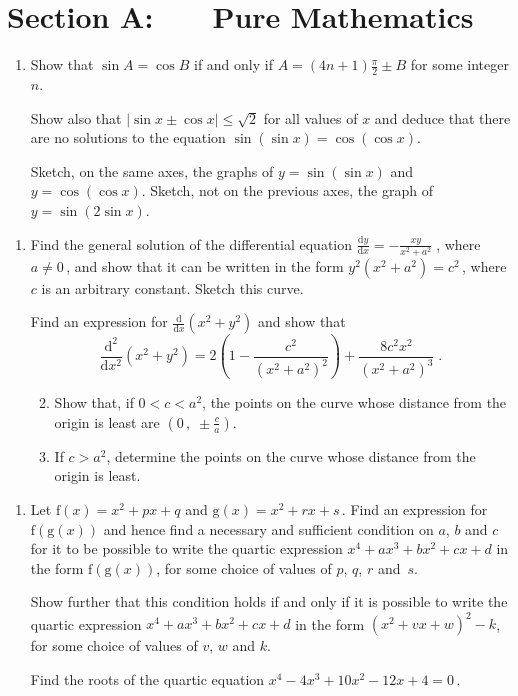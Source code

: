 \documentclass[a4, 11pt]{report}
\newlength{\qspace}
\newcounter{qnumber}
\newenvironment{question}%
 {\vspace{\qspace}
  \begin{enumerate}[\bfseries 1\quad][10]%
    \setcounter{enumi}{\value{qnumber}}%
    \item%
 }
{
  \end{enumerate}
  \filbreak
  \stepcounter{qnumber}
 }
\newenvironment{questionparts}[1][1]%
 {
  \begin{enumerate}[\bfseries (i)]%
    \setcounter{enumii}{#1}
    \addtocounter{enumii}{-1}
    \setlength{\itemsep}{5mm}
    \setlength{\parskip}{8pt}
 }
 {
  \end{enumerate}
 }
\def\g{{\mathrm g}}
\def\f{{\mathrm f}}
\def\le{\leqslant}
\newcommand{\ds}{\displaystyle}
\def\l{\left(}
\def\r{\right)}
\begin{document}
\setcounter{page}{2}

 
\section*{Section A: \ \ \ Pure Mathematics}

\begin{question}
Show that $\sin A = \cos B$ if and only if $\ds A = (4n+1)\frac{\pi}{2}
\pm B$ for some integer $n$.

Show also that 
$\big\vert\sin x \pm \cos x \big\vert \le \sqrt{2}$ for all values of $x$ and
deduce  that there are no solutions to the equation $\sin
\left( \sin x \right) = \cos \left( \cos x \right)$.

Sketch, on the same axes, the graphs of $y= \sin \left( \sin x \right)$ and
$y = \cos \left( \cos x \right)$. Sketch, not on the previous axes,
the graph of  $y= \sin \left(2 \sin x \right)$.
\end{question}

\begin{question}
Find the general solution of the differential equation  
$\ds \frac{\mathrm{d}y}{\mathrm{d}x} = -\frac{xy}{x^2+a^2}\;$,  
where $a\ne0\,$, and show that it can be written in the form
$\ds y^2(x^2+a^2)= c^2\,$,  
where $c$ is an arbitrary constant.
Sketch this curve. 
 
Find an expression for  
$\ds \frac{\mathrm{d}}{\mathrm{d}x} (x^2+y^2)$  
and  show that
\[
 \frac{\mathrm{d^2}}{\mathrm{d}x^2} (x^2+y^2) = 
2\left(1 -\frac {c^2}{(x^2+a^2)^2} \right) + \frac{8c^2x^2}{(x^2+a^2)^3}\;.
\]

\begin{questionparts}
\item
Show that, if $0<c<a^2$,  
the points on the curve whose distance from the origin  
is least are $\ds \l 0\,,\;\pm \frac{c}{a}\r$. 
 \item
If $c>a^2$, determine the points  
on the curve whose distance from the origin is least. 
 \end{questionparts}
\end{question}

\begin{question}
Let  
$\f(x)=x^2+px+q$ and $\g(x)=x^2+rx+s\,$.  
Find an expression for $\f ( \g (x))$  
and hence find a necessary and sufficient condition  
on $a$, $b$ and $c$  for it to be possible to  
write the quartic expression $x^4+ax^3+bx^2+cx+d$  
in the form $\f ( \g (x))$, for some choice of values  
of $p$, $q$, $r$ and~$s$.  
 
Show further that this condition holds  
if and only if it is possible to write  
the quartic expression  
$x^4+ax^3+bx^2+cx+d$ in the form $(x^2+vx+w)^2-k$,  
for some choice of values of $v$, $w$ and $k$. 
 
Find the roots of the quartic equation $x^4-4x^3+10x^2-12x+4=0\,$. 
\end{question}
\end{document}
